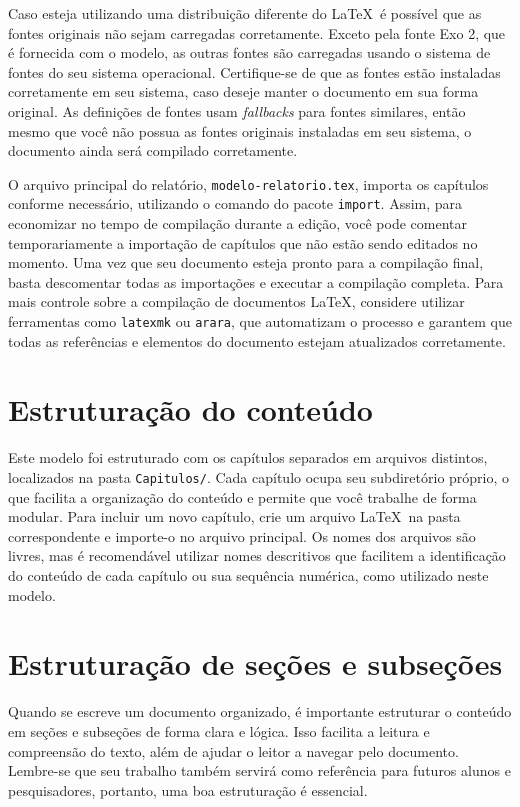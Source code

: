 Caso esteja utilizando uma distribuição diferente do \LaTeX\, é possível que as fontes originais não
sejam carregadas corretamente. Exceto pela fonte Exo 2, que é fornecida com o modelo, as outras
fontes são carregadas usando o sistema de fontes do seu sistema operacional. Certifique-se de que as
fontes estão instaladas corretamente em seu sistema, caso deseje manter o documento em sua forma
original. As definições de fontes usam \emph{fallbacks} para fontes similares, então mesmo que você
não possua as fontes originais instaladas em seu sistema, o documento ainda será compilado corretamente.

O arquivo principal do relatório, \texttt{modelo-relatorio.tex}, importa os capítulos conforme
necessário, utilizando o comando \verb|| do pacote \texttt{import}. Assim, para economizar no tempo de compilação durante a edição, você pode comentar temporariamente a importação
de capítulos que não estão sendo editados no momento. Uma vez que seu documento esteja pronto para a
compilação final, basta descomentar todas as importações e executar a compilação completa. Para mais
controle sobre a compilação de documentos \LaTeX, considere utilizar ferramentas como
\texttt{latexmk} ou \texttt{arara}, que automatizam o processo e garantem que todas as referências e elementos do documento estejam atualizados corretamente.

\section{Estruturação do conteúdo}\label{sec:estrutura-desenvolvimento}

Este modelo  foi estruturado com os capítulos separados em arquivos distintos, localizados na
pasta \texttt{Capitulos/}. Cada capítulo ocupa seu subdiretório próprio, o que facilita a
organização do conteúdo e permite que você trabalhe de forma modular. Para
incluir um novo capítulo, crie um arquivo \LaTeX\ na pasta correspondente e importe-o no arquivo
principal. Os nomes dos arquivos são livres, mas é recomendável utilizar nomes descritivos que
facilitem a identificação do conteúdo de cada capítulo ou sua sequência numérica, como utilizado
neste modelo.

\section{Estruturação de seções e subseções}\label{sec:secoes-desenvolvimento}

Quando se escreve um documento organizado, é importante estruturar o conteúdo em seções e subseções
de forma clara e lógica. Isso facilita a leitura e compreensão do texto, além de ajudar o leitor a
navegar pelo documento. Lembre-se que seu trabalho também servirá como referência para futuros
alunos e pesquisadores, portanto, uma boa estruturação é essencial.

